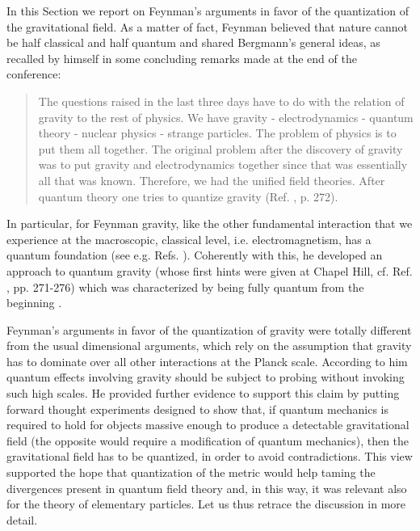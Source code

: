 \documentclass{ws-procs961x669}            %
\begin{document}
In this Section we report on Feynman's arguments in favor of the
quantization of the gravitational field. As a matter of fact,
Feynman believed that nature cannot be half classical and half
quantum and shared Bergmann's general ideas, as recalled by
himself in some concluding remarks made at the end of the
conference:
\begin{quote}
The questions raised in the last three days have to do with the
relation of gravity to the rest of physics. We have gravity -
electrodynamics - quantum theory - nuclear physics - strange
particles. The problem of physics is to put them all together. The
original problem after the discovery of gravity was to put gravity
and electrodynamics together since that was essentially all that
was known. Therefore, we had the unified field theories. After
quantum theory one tries to quantize gravity (Ref.
, p. 272).
\end{quote}
In particular, for Feynman gravity, like the other fundamental
interaction that we experience at the macroscopic, classical
level, i.e. electromagnetism, has a quantum foundation (see e.g.
Refs. ).
Coherently with this, he developed an approach to quantum gravity
(whose first hints were given at Chapel Hill, cf. Ref.
, pp. 271-276) which was characterized by
being fully quantum from the beginning
\cite{Feynman:1996kb,Feynman:1963ax}.

Feynman's arguments in favor of the quantization of gravity were
totally different from the usual dimensional arguments, which rely
on the assumption that gravity has to dominate over all other
interactions at the Planck scale. According to him quantum effects
involving gravity should be subject to probing without invoking
such high scales. He provided further evidence to support this
claim by putting forward thought experiments designed to show
that, if quantum mechanics is required to hold for objects massive
enough to produce a detectable gravitational field (the opposite
would require a modification of quantum mechanics), then the
gravitational field has to be quantized, in order to avoid
contradictions. This view supported the hope that quantization of
the metric would help taming the divergences present in quantum
field theory and, in this way, it was relevant also for the theory
of elementary particles. Let us thus retrace the discussion in
more detail.
\end{document}
